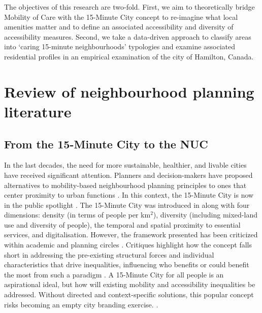 \documentclass[
  authoryear,
  preprint,
  3p]{elsarticle}
\begin{document}
The objectives of this research are two-fold. First, we aim to
theoretically bridge Mobility of Care with the 15-Minute City concept to
re-imagine what local amenities matter and to define an associated
accessibility and diversity of accessibility measures. Second, we take a
data-driven approach to classify areas into `caring 15-minute
neighbourhoods' typologies and examine associated residential profiles
in an empirical examination of the city of Hamilton, Canada.

\section{Review of neighbourhood planning
literature}\label{review-of-neighbourhood-planning-literature}

\subsection{From the 15-Minute City to the
NUC}\label{from-the-15-minute-city-to-the-nuc}

In the last decades, the need for more sustainable, healthier, and
livable cities have received significant attention. Planners and
decision-makers have proposed alternatives to mobility-based
neighbourhood planning principles to ones that center proximity to urban
functions \citep{pozoukidou15MinuteCityDecomposing2021}. In this
context, the 15-Minute City is now in the public spotlight
\citep{logan_xminute_2022, moreno_introducing_2021}. The 15-Minute City
was introduced in \citet{moreno_introducing_2021} along with four
dimensions: density (in terms of people per km\(^2\)), diversity
(including mixed-land use and diversity of people), the temporal and
spatial proximity to essential services, and digitalisation. However,
the framework presented has been criticized within academic and planning
circles \citep{guzmanProximityEnoughCritical2024}. Critiques highlight
how the concept falls short in addressing the pre-existing structural
forces and individual characteristics that drive inequalities,
influencing who benefits or could benefit the most from such a paradigm
\citep{dimarino15minuteCityConcept2023, willberg15minuteCityAll2023}. A
15-Minute City for all people is an aspirational ideal, but how will
existing mobility and accessibility inequalities be addressed. Without
directed and context-specific solutions, this popular concept risks
becoming an empty city branding exercise.
\citep{pozoukidou15MinuteCityDecomposing2021, gowerPlanningInnovationCity2022}.
\end{document}
